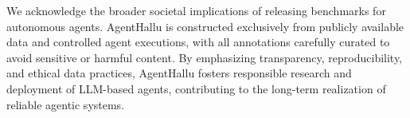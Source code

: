 We acknowledge the broader societal implications of releasing benchmarks for autonomous agents. AgentHallu is constructed exclusively from publicly available data and controlled agent executions, with all annotations carefully curated to avoid sensitive or harmful content. By emphasizing transparency, reproducibility, and ethical data practices, AgentHallu fosters responsible research and deployment of LLM-based agents, contributing to the long-term realization of reliable agentic systems.



